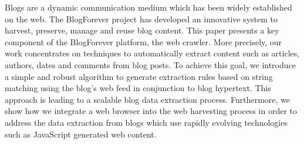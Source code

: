 Blogs are a dynamic communication medium which has been widely established on the web. The BlogForever project has developed an innovative system to harvest, preserve, manage and reuse blog content. This paper presents a key component of the BlogForever platform, the web crawler. More precisely, our work concentrates on techniques to automatically extract content such as articles, authors, dates and comments from blog posts. To achieve this goal, we introduce a simple and robust algorithm to generate extraction rules based on string matching using the blog's web feed in conjunction to blog hypertext. This approach is leading to a scalable blog data extraction process. Furthermore, we show how we integrate a web browser into the web harvesting process in order to address the data extraction from blogs which use rapidly evolving technologies such as JavaScript generated web content.
